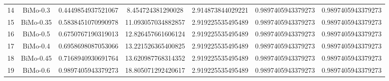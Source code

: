 \documentclass[a4paper,10pt]{article}
\begin{document}
\begin{landscape}
\begin{table}[!htp]
\begin{tabular}{ccccccc}
14&BiMo-0.3&0.4449854937521067&8.454724381290028&2.914873844029221&0.9897405943379273&0.9897405943379273\\
15&BiMo-0.35&0.5838451070990978&11.093057034882857&2.919225535495489&0.9897405943379273&0.9897405943379273\\
16&BiMo-0.5&0.6750767190319013&12.826457661606124&2.919225535495489&0.9897405943379273&0.9897405943379273\\
17&BiMo-0.4&0.6958698087053066&13.221526365400825&2.919225535495489&0.9897405943379273&0.9897405943379273\\
18&BiMo-0.45&0.7168940930691764&13.620987768314352&2.919225535495489&0.9897405943379273&0.9897405943379273\\
19&BiMo-0.6&0.9897405943379273&18.805071292420617&2.919225535495489&0.9897405943379273&0.9897405943379273\\
\hline
\end{tabular}
\end{table}


\end{landscape}
\end{document}
